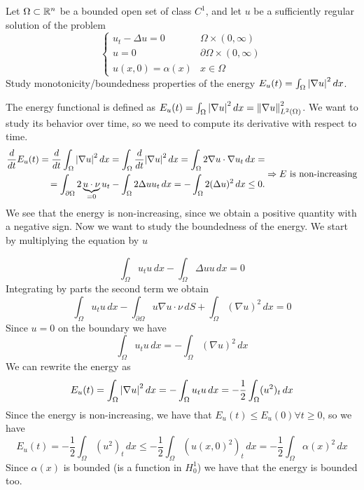 \begin{exercise}
    Let \(\Omega \subset \mathbb{R}^n\) be a bounded open set of class \(C^1\), and let \(u\) be a sufficiently regular solution of the problem
    \[
        \begin{cases}
            u_t - \Delta u = 0 & \Omega \times (0, \infty) \\
            u = 0 & \partial\Omega \times (0, \infty) \\
            u(x, 0) = \alpha(x) & x \in \Omega
        \end{cases}
    \]
    Study monotonicity/boundedness properties of the energy \(E_u(t) = \int_\Omega \abs{\nabla u}^2 \, dx\).
\end{exercise}
The energy functional is defined as \(E_u(t) = \int_\Omega \abs{\nabla u}^2 \, dx = \norm{\nabla u}^2_{L^2(\Omega)}\). We want to study its behavior over time, so we need to compute its derivative with respect to time.
\[
    \begin{split}
        \frac{d}{dt} E_u(t) = \frac{d}{dt} \int_\Omega \abs{\nabla u}^2 \, dx = \int_\Omega \frac{d}{dt} \abs{\nabla u}^2 \, dx = \int_\Omega 2 \nabla u \cdot \nabla u_t \, dx = \\
        = \int_{\partial\Omega} 2 \underbrace{u \cdot \nu}_{=0} u_t - \int_\Omega 2 \Delta u u_t \, dx = - \int_\Omega 2 (\Delta u)^2 \, dx \leq 0.
    \end{split}
    \Rightarrow E \text{ is non-increasing}
\]
We see that the energy is non-increasing, since we obtain a positive quantity with a negative sign. Now we want to study the boundedness of the energy. We start by multiplying the equation by \(u\)  

\[
    \int_\Omega u_t u \, dx - \int_\Omega \Delta u u \, dx = 0
\]
Integrating by parts the second term we obtain
\[
    \int_\Omega u_t u \, dx - \int_{\partial\Omega} u \nabla u \cdot \nu \, dS + \int_\Omega (\nabla u)^2 \, dx = 0
\]
Since \(u = 0\) on the boundary we have
\[
    \int_\Omega u_t u \, dx = - \int_\Omega (\nabla u)^2 \, dx 
\]
We can rewrite the energy as
\[
    E_u(t) = \int_\Omega \abs{\nabla u}^2 \, dx = - \int_\Omega u_t u \, dx = - \frac{1}{2} \int_\Omega (u^2)_t \, dx
\]
Since the energy is non-increasing, we have that \(E_u(t) \leq E_u(0) \forall t \geq 0\), so we have 
\[
    E_u(t) = - \frac{1}{2} \int_\Omega (u^2)_t \, dx \leq - \frac{1}{2} \int_\Omega (u(x, 0)^2)_t \, dx = - \frac{1}{2} \int_\Omega \alpha(x)^2 \, dx
\]
Since \(\alpha(x)\) is bounded (is a function in \(H^1_0\)) we have that the energy is bounded too.

